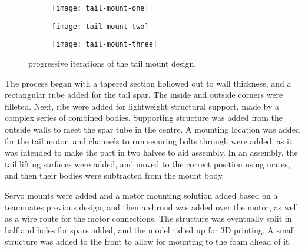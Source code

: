 \documentclass[../../main.tex]{subfiles}
\begin{document}

\begin{figure}[H]
    \centering
    \begin{subfigure}[b]{0.32\columnwidth}
        \centering
        \texttt{[image: tail-mount-one]}
        \caption{}
        \label{fig:tail-mount-progression:initial}
    \end{subfigure}
    \hfill
    \begin{subfigure}[b]{0.32\columnwidth}
        \centering
        \texttt{[image: tail-mount-two]}
        \caption{}
        \label{fig:tail-mount-progression:revised}
    \end{subfigure}
    \hfill
    \begin{subfigure}[b]{0.32\columnwidth}
        \centering
        \texttt{[image: tail-mount-three]}
        \caption{}
        \label{fig:tail-mount-progression:final}
    \end{subfigure}
    
    \caption{progressive iterations of the tail mount design.}
    \label{fig:tail-mount-progression}
\end{figure} 

The process began with a tapered section hollowed out to  wall thickness, and a rectangular tube added for the tail spar.
The inside and outside corners were filleted. 
Next, ribs were added for lightweight structural support, made by a complex series of combined bodies.
Supporting structure was added from the outside walls to meet the spar tube in the centre.
A mounting location was added for the tail motor, and channels to run securing bolts through were added, as it was intended to make the part in two halves to aid assembly.  
In an assembly, the tail lifting surfaces were added, and moved to the correct position using mates, and then their bodies were subtracted from the mount body. 

Servo mounts were added and a motor mounting solution added based on a teammates previous design, and then a shroud was added over the motor, as well as a wire route for the motor connections.
The structure was eventually split in half and holes for spars added, and the model tidied up for 3D printing. 
A small structure was added to the front to allow for mounting to the foam ahead of it.
\end{document}

